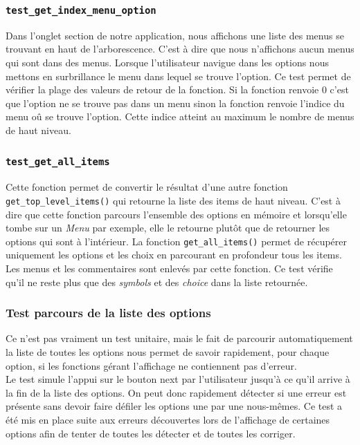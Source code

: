 \documentclass[17pts]{report}
\begin{document}
\subsubsection{\texttt{test\_get\_index\_menu\_option}}
\label{ssub:TestGetIndexMenuOption}
Dans l'onglet section de notre application, nous affichons une liste des menus
se trouvant en haut de l'arborescence. C'est à dire que nous n'affichons aucun
menus qui sont dans des menus. Lorsque l'utilisateur navigue dans les options
nous mettons en surbrillance le menu dans lequel se trouve l'option.  Ce test
permet de vérifier la plage des valeurs de retour de la fonction.  Si la
fonction renvoie 0 c'est que l'option ne se trouve pas dans un menu sinon la
fonction renvoie l'indice du menu oû se trouve l'option. Cette indice atteint
au maximum le nombre de menus de haut niveau.

\subsubsection{\texttt{test\_get\_all\_items}}
\label{ssub:TestGetAllItems}
Cette fonction permet de convertir le résultat d'une autre fonction
\verb|get_top_level_items()| qui retourne la liste des items de haut niveau.
C'est à dire que cette fonction parcours l'ensemble des options en mémoire et
lorsqu'elle tombe sur un \textit{Menu} par exemple, elle le retourne plutôt que
de retourner les options qui sont à l'intérieur. La fonction
\verb|get_all_items()| permet de récupérer uniquement les options et les choix
en parcourant en profondeur tous les items. Les menus et les commentaires sont
enlevés par cette fonction. Ce test vérifie qu'il ne reste plus que des
\textit{symbols} et des \textit{choice} dans la liste retournée.

\subsubsection{Test parcours de la liste des options}
\label{ssub:Test parcours de la liste des options}
Ce n'est pas vraiment un test unitaire, mais le fait de parcourir
automatiquement la liste de toutes les options nous permet de savoir
rapidement, pour chaque option, si les fonctions gérant l'affichage ne
contiennent pas d'erreur. \\

Le test simule l'appui sur le bouton next par l'utilisateur jusqu'à ce qu'il
arrive à la fin de la liste des options. On peut donc rapidement détecter si
une erreur est présente sans devoir faire défiler les options une par une
nous-mêmes. Ce test a été mis en place suite aux erreurs découvertes lors de
l'affichage de certaines options afin de tenter de toutes les détecter et de
toutes les corriger.
\end{document}
